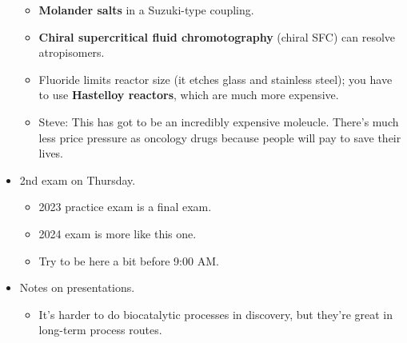 \documentclass[../notes.tex]{subfiles}
\begin{document}
\begin{itemize}
\begin{itemize}
\begin{itemize}
        \end{itemize}
        \item \textbf{Molander salts} in a Suzuki-type coupling.
        \item \textbf{Chiral supercritical fluid chromotography} (chiral SFC) can resolve atropisomers.
        \item Fluoride limits reactor size (it etches glass and stainless steel); you have to use \textbf{Hastelloy reactors}, which are much more expensive.
        \item Steve: This has got to be an incredibly expensive moleucle. There's much less price pressure as oncology drugs because people will pay to save their lives.
    \end{itemize}
    \item 2nd exam on Thursday.
    \begin{itemize}
        \item 2023 practice exam is a final exam.
        \item 2024 exam is more like this one.
        \item Try to be here a bit before 9:00 AM.
    \end{itemize}
    \item Notes on presentations.
    \begin{itemize}
        \item It's harder to do biocatalytic processes in discovery, but they're great in long-term process routes.
    \end{itemize}
\end{itemize}
\end{document}
